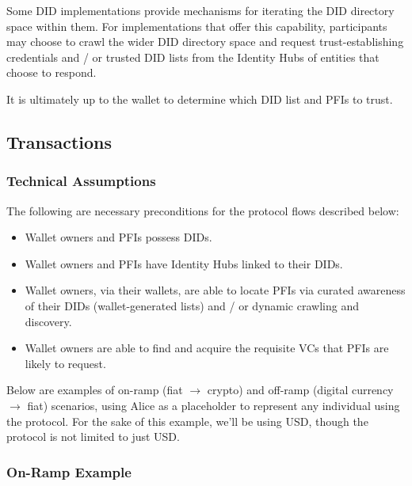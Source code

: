 \documentclass[11pt]{article}
\begin{document}
Some DID implementations provide mechanisms for iterating the DID directory space within them. For implementations that offer this capability, participants may choose to crawl the wider DID directory space and request trust-establishing credentials and / or trusted DID lists from the Identity Hubs of entities that choose to respond.

\vspace{1\baselineskip}
It is ultimately up to the wallet to determine which DID list and PFIs to trust.

\vspace{1\baselineskip}
\subsection{Transactions}

\subsubsection{Technical Assumptions}

The following are necessary preconditions for the protocol flows described below:

\begin{itemize}
	\item Wallet owners and PFIs possess DIDs. 

	\item Wallet owners and PFIs have Identity Hubs linked to their DIDs.

	\item Wallet owners, via their wallets, are able to locate PFIs via curated awareness of their DIDs (wallet-generated lists) and / or dynamic crawling and discovery.

	\item Wallet owners are able to find and acquire the requisite VCs that PFIs are likely to request.

\vspace{1\baselineskip}
\end{itemize}
Below are examples of on-ramp (fiat $\rightarrow$ crypto) and off-ramp (digital currency $\rightarrow$ fiat) scenarios, using Alice as a placeholder to represent any individual using the protocol. For the sake of this example, we’ll be using USD, though the protocol is not limited to just USD.

\subsubsection{On-Ramp Example}
\end{document}
